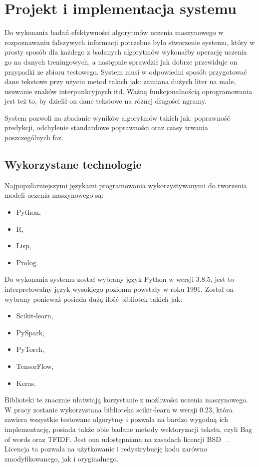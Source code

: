 \chapter{Projekt i implementacja systemu}
Do wykonania badań efektywności algorytmów uczenia maszynowego w rozpoznawaniu
fałszywych informacji potrzebne było stworzenie systemu, który w prosty sposób 
dla każdego z badanych algorytmów wykonałby operację uczenia go na danych treningowych,
a następnie sprawdził jak dobrze przewiduje on przypadki ze zbioru testowego.
System musi w odpowiedni sposób przygotować dane tekstowe przy użyciu metod takich jak: zamiana dużych liter na małe, usuwanie znaków interpunkcyjnych itd.
Ważną funkcjonalnością oprogramowania jest też to, by dzielił on dane tekstowe na 
różnej długości ngramy. 

System pozwoli na zbadanie wyników algorytmów takich jak: poprawność predykcji,
odchylenie standardowe poprawności oraz czasy trwania poszczególnych faz.

\section{Wykorzystane technologie}
Najpopularniejszymi językami programowania wykorzystywanymi do tworzenia modeli uczenia
maszynowego są:
\begin{itemize}
    \item Python,
    \item R,
    \item Lisp,
    \item Prolog.
\end{itemize}
Do wykonania systemu został wybrany język Python w wersji 3.8.5, jest to interpretowalny
język wysokiego poziomu powstały w roku 1991. Został on wybrany 
ponieważ posiada dużą ilość bibliotek takich jak: 
\begin{itemize}
    \item Scikit-learn,
    \item PySpark,
    \item PyTorch,
    \item TensorFlow,
    \item Keras.
\end{itemize}
Biblioteki te znacznie ułatwiają korzystanie z możliwości uczenia maszynowego.
W pracy zostanie wykorzystana biblioteka scikit-learn w wersji 0.23, która zawiera wszystkie 
testowane algorytmy i pozwala na bardzo wygodną ich implementację, posiada także obie 
badane metody wektoryzacji tekstu, czyli Bag of words oraz TFIDF. Jest ona udostępniana na zasadach licencji BSD ~\cite{scikitlearn}. 
Licencja ta pozwala na użytkowanie i redystrybucję kodu zarówno zmodyfikowanego, jak i oryginalnego.

